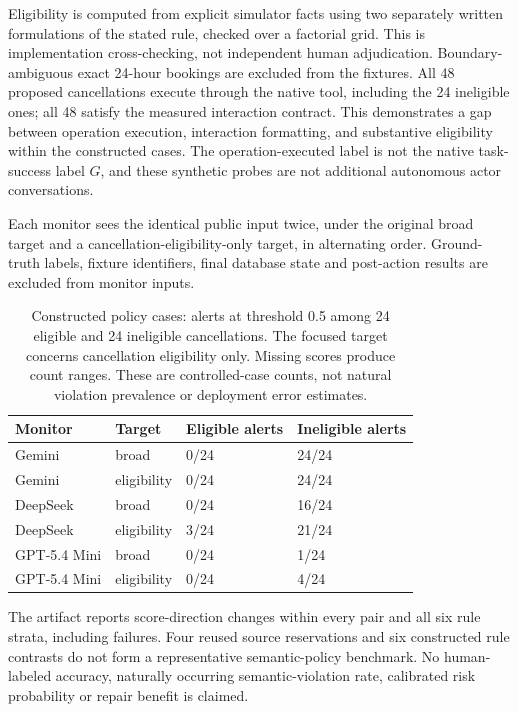 Eligibility is computed from explicit simulator facts using two separately written formulations of the stated rule, checked over a factorial grid. This is implementation cross-checking, not independent human adjudication. Boundary-ambiguous exact 24-hour bookings are excluded from the fixtures. All 48 proposed cancellations execute through the native tool, including the 24 ineligible ones; all 48 satisfy the measured interaction contract. This demonstrates a gap between operation execution, interaction formatting, and substantive eligibility within the constructed cases. The operation-executed label is not the native task-success label $G$, and these synthetic probes are not additional autonomous actor conversations.

Each monitor sees the identical public input twice, under the original broad target and a cancellation-eligibility-only target, in alternating order. Ground-truth labels, fixture identifiers, final database state and post-action results are excluded from monitor inputs.
\begin{table}[t]\centering\small
\caption{Constructed policy cases: alerts at threshold 0.5 among 24 eligible and 24 ineligible cancellations. The focused target concerns cancellation eligibility only. Missing scores produce count ranges. These are controlled-case counts, not natural violation prevalence or deployment error estimates.}\label{tab:policy-lab}
\begin{tabular}{llll}
\toprule
Monitor & Target & Eligible alerts & Ineligible alerts\\
\midrule
Gemini & broad & 0/24 & 24/24\\
Gemini & eligibility & 0/24 & 24/24\\
DeepSeek & broad & 0/24 & 16/24\\
DeepSeek & eligibility & 3/24 & 21/24\\
GPT-5.4 Mini & broad & 0/24 & 1/24\\
GPT-5.4 Mini & eligibility & 0/24 & 4/24\\
\bottomrule
\end{tabular}
\end{table}
The artifact reports score-direction changes within every pair and all six rule strata, including failures. Four reused source reservations and six constructed rule contrasts do not form a representative semantic-policy benchmark. No human-labeled accuracy, naturally occurring semantic-violation rate, calibrated risk probability or repair benefit is claimed.
